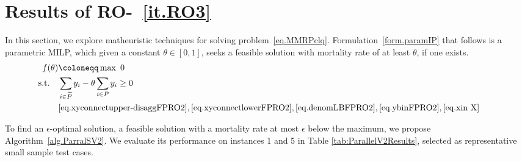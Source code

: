 \section{Results of RO-~\ref{it.RO3}}
In this section, we explore matheuristic techniques for solving problem~\eqref{eq.MMRPclq}. Formulation~\eqref{form.paramIP} that follows is a parametric MILP, which given a constant $\theta \in [0,1]$, seeks a feasible solution with mortality rate of at least $\theta$, if one exists.
\begin{subequations}\label{form.paramIP}
\begin{align}
 f(\theta) &\coloneqq \label{eq.paramobj} \max\  0   \\
\text{s.t.}\quad \label{eq.thetacon} &\sum\limits_{i \in \widetilde{P}} y_i - \theta\sum\limits_{i \in P} y_i \ge 0 \\
& \eqref{eq.xyconnectupper-disaggFPRO2}, \eqref{eq.xyconnectlowerFPRO2}, \eqref{eq.denomLBFPRO2}, \eqref{eq.ybinFPRO2}, \eqref{eq.xin X} && \nonumber
\end{align}
\end{subequations}

To find an $\epsilon$-optimal solution, a feasible solution with a mortality rate at most $\epsilon$ below the maximum, we propose {Algorithm~\ref{alg.ParralSV2}}. We evaluate its performance on {instances 1 and 5} in Table \ref{tab:ParallelV2Results}, selected as representative small sample test cases.
\begin{algorithm}[!htbp]
\footnotesize
\label{alg.ParralSV2}
\SetAlgoLined
{}

\caption{Parallel Search for Maximum Mortality Rate}
\end{algorithm}

